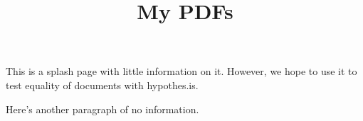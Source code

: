 \documentclass{article}
\begin{document}
\title{My PDFs}
This is a splash page with little information on it. However, we hope
to use it to test equality of documents with hypothes.is.

Here's another paragraph of no information.
\end{document}

